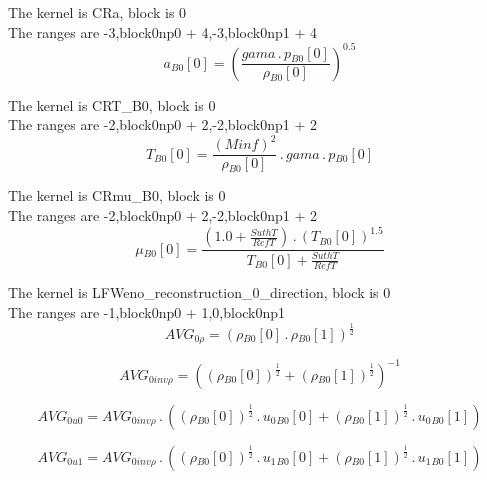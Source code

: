 \documentclass{article}
\begin{document}
\noindent The kernel is CRa, block is 0\\\noindent The ranges are -3,block0np0 + 4,-3,block0np1 + 4\\\begin{dmath}{a{_{B0}}}[{0}] = \left(\frac{gama \,.\, {p{_{B0}}}[{0}]}{{\rho{_{B0}}}[{0}]} \right)^{0.5}\end{dmath}

\noindent The kernel is CRT_B0, block is 0\\\noindent The ranges are -2,block0np0 + 2,-2,block0np1 + 2\\\begin{dmath}{T{_{B0}}}[{0}] = \frac{\left(Minf \right)^{2}}{{\rho{_{B0}}}[{0}]} \,.\, gama \,.\, {p{_{B0}}}[{0}]\end{dmath}

\noindent The kernel is CRmu_B0, block is 0\\\noindent The ranges are -2,block0np0 + 2,-2,block0np1 + 2\\\begin{dmath}{\mu{_{B0}}}[{0}] = \frac{\left(1.0 + \frac{SuthT}{RefT}\right) \,.\, \left({T{_{B0}}}[{0}] \right)^{1.5}}{{T{_{B0}}}[{0}] + \frac{SuthT}{RefT}}\end{dmath}

\noindent The kernel is LFWeno_reconstruction_0_direction, block is 0\\\noindent The ranges are -1,block0np0 + 1,0,block0np1\\\begin{dmath}AVG_{0 \rho} = \left({\rho{_{B0}}}[{0}] \,.\, {\rho{_{B0}}}[{1}] \right)^{\frac{1}{2}}\end{dmath}

\begin{dmath}AVG_{0 inv \rho} = \left(\left({\rho{_{B0}}}[{0}] \right)^{\frac{1}{2}} + \left({\rho{_{B0}}}[{1}] \right)^{\frac{1}{2}} \right)^{-1}\end{dmath}

\begin{dmath}AVG_{0 u0} = AVG_{0 inv \rho} \,.\, \left(\left({\rho{_{B0}}}[{0}] \right)^{\frac{1}{2}} \,.\, {u_{0}{_{B0}}}[{0}] + \left({\rho{_{B0}}}[{1}] \right)^{\frac{1}{2}} \,.\, {u_{0}{_{B0}}}[{1}]\right)\end{dmath}

\begin{dmath}AVG_{0 u1} = AVG_{0 inv \rho} \,.\, \left(\left({\rho{_{B0}}}[{0}] \right)^{\frac{1}{2}} \,.\, {u_{1}{_{B0}}}[{0}] + \left({\rho{_{B0}}}[{1}] \right)^{\frac{1}{2}} \,.\, {u_{1}{_{B0}}}[{1}]\right)\end{dmath}
\end{document}
